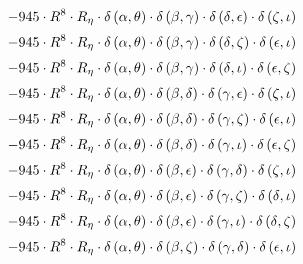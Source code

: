 \begin{subequations}
\begin{gather}
 \\[0.2em] \notag 		 - 945 \cdot R^{8} \cdot R_{\eta{}} \cdot \delta{}\left(\alpha{}, \theta{}\right) \cdot \delta{}\left(\beta{}, \gamma{}\right) \cdot \delta{}\left(\delta{}, \epsilon{}\right) \cdot \delta{}\left(\zeta{}, \iota{}\right) 
 \\[0.2em] \notag 		 - 945 \cdot R^{8} \cdot R_{\eta{}} \cdot \delta{}\left(\alpha{}, \theta{}\right) \cdot \delta{}\left(\beta{}, \gamma{}\right) \cdot \delta{}\left(\delta{}, \zeta{}\right) \cdot \delta{}\left(\epsilon{}, \iota{}\right) 
 \\[0.2em] \notag 		 - 945 \cdot R^{8} \cdot R_{\eta{}} \cdot \delta{}\left(\alpha{}, \theta{}\right) \cdot \delta{}\left(\beta{}, \gamma{}\right) \cdot \delta{}\left(\delta{}, \iota{}\right) \cdot \delta{}\left(\epsilon{}, \zeta{}\right) 
 \\[0.2em] \notag 		 - 945 \cdot R^{8} \cdot R_{\eta{}} \cdot \delta{}\left(\alpha{}, \theta{}\right) \cdot \delta{}\left(\beta{}, \delta{}\right) \cdot \delta{}\left(\gamma{}, \epsilon{}\right) \cdot \delta{}\left(\zeta{}, \iota{}\right) 
 \\[0.2em] \notag 		 - 945 \cdot R^{8} \cdot R_{\eta{}} \cdot \delta{}\left(\alpha{}, \theta{}\right) \cdot \delta{}\left(\beta{}, \delta{}\right) \cdot \delta{}\left(\gamma{}, \zeta{}\right) \cdot \delta{}\left(\epsilon{}, \iota{}\right) 
 \\[0.2em] \notag 		 - 945 \cdot R^{8} \cdot R_{\eta{}} \cdot \delta{}\left(\alpha{}, \theta{}\right) \cdot \delta{}\left(\beta{}, \delta{}\right) \cdot \delta{}\left(\gamma{}, \iota{}\right) \cdot \delta{}\left(\epsilon{}, \zeta{}\right) 
 \\[0.2em] \notag 		 - 945 \cdot R^{8} \cdot R_{\eta{}} \cdot \delta{}\left(\alpha{}, \theta{}\right) \cdot \delta{}\left(\beta{}, \epsilon{}\right) \cdot \delta{}\left(\gamma{}, \delta{}\right) \cdot \delta{}\left(\zeta{}, \iota{}\right) 
 \\[0.2em] \notag 		 - 945 \cdot R^{8} \cdot R_{\eta{}} \cdot \delta{}\left(\alpha{}, \theta{}\right) \cdot \delta{}\left(\beta{}, \epsilon{}\right) \cdot \delta{}\left(\gamma{}, \zeta{}\right) \cdot \delta{}\left(\delta{}, \iota{}\right) 
 \\[0.2em] \notag 		 - 945 \cdot R^{8} \cdot R_{\eta{}} \cdot \delta{}\left(\alpha{}, \theta{}\right) \cdot \delta{}\left(\beta{}, \epsilon{}\right) \cdot \delta{}\left(\gamma{}, \iota{}\right) \cdot \delta{}\left(\delta{}, \zeta{}\right) 
 \\[0.2em] \notag 		 - 945 \cdot R^{8} \cdot R_{\eta{}} \cdot \delta{}\left(\alpha{}, \theta{}\right) \cdot \delta{}\left(\beta{}, \zeta{}\right) \cdot \delta{}\left(\gamma{}, \delta{}\right) \cdot \delta{}\left(\epsilon{}, \iota{}\right) 

\end{gather}
\end{subequations}
